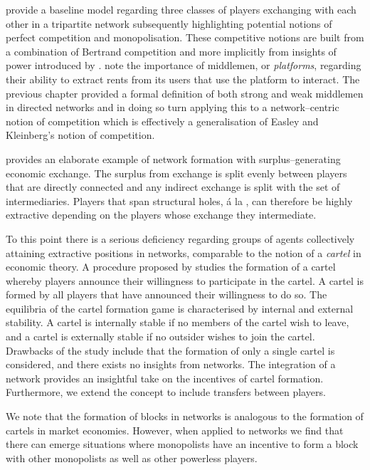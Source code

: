 \citet{EasleyKleinberg2010} provide a baseline model regarding three classes of players exchanging with each other in a tripartite network subsequently highlighting potential notions of perfect competition and monopolisation. These competitive notions are built from a combination of Bertrand competition and more implicitly from insights of power introduced by \citet{Emerson1962}. \citet{GillesDiamantaris2013} note the importance of middlemen, or \emph{platforms}, regarding their ability to extract rents from its users that use the platform to interact. The previous chapter provided a formal definition of both strong and weak middlemen in directed networks and in doing so turn applying this to a network--centric notion of competition which is effectively a generalisation of Easley and Kleinberg's notion of competition.

\citet{GoyalVega-holes} provides an elaborate example of network formation with surplus--generating economic exchange. The surplus from exchange is split evenly between players that are directly connected and any indirect exchange is split with the set of intermediaries. Players that span structural holes, \'{a} la \citet{Burt1992}, can therefore be highly extractive depending on the players whose exchange they intermediate.

To this point there is a serious deficiency regarding groups of agents collectively attaining extractive positions in networks, comparable to the notion of a \emph{cartel} in economic theory. A procedure proposed by \citet{Aspremont1983} studies the formation of a cartel whereby players announce their willingness to participate in the cartel. A cartel is formed by all players that have announced their willingness to do so. The equilibria of the cartel formation game is characterised by internal and external stability. A cartel is internally stable if no members of the cartel wish to leave, and a cartel is externally stable if no outsider wishes to join the cartel. Drawbacks of the study include that the formation of only a single cartel is considered, and there exists no insights from networks. The integration of a network provides an insightful take on the incentives of cartel formation. Furthermore, we extend the concept to include transfers between players.

We note that the formation of blocks in networks is analogous to the formation of cartels in market economies. However, when applied to networks we find that there can emerge situations where monopolists have an incentive to form a block with other monopolists as well as other powerless players.

